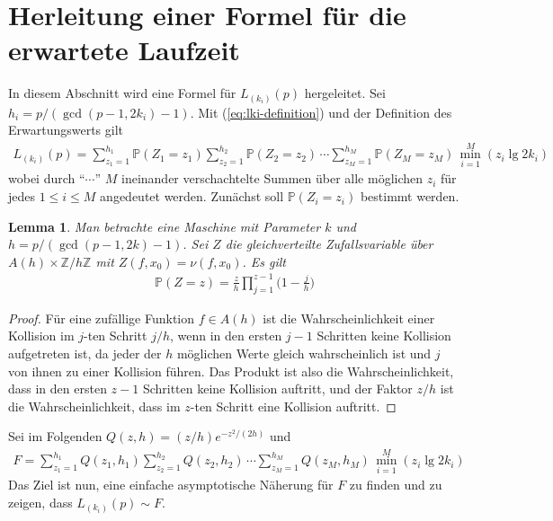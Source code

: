 \documentclass[a4paper, 11pt, ngerman]{article}
\newcommand{\Z}{\mathbb{Z}}
\renewcommand{\P}{\mathbb{P}}
\theoremstyle{definition}
\theoremstyle{plain}
\newtheorem{lemma}{Lemma}
\theoremstyle{remark}
\begin{document}
\section{Herleitung einer Formel für die erwartete Laufzeit}
\label{sec:formula-running-time}

In diesem Abschnitt wird eine Formel für $L_{(k_i)}(p)$ hergeleitet. Sei $h_i = p/(\gcd(p - 1, 2k_i) - 1)$. Mit (\ref{eq:lki-definition}) und der Definition des Erwartungswerts gilt
\begin{align}
    L_{(k_i)}(p) =
    \sum_{z_1 = 1}^{h_1} \P(Z_1 = z_1)
    \sum_{z_2 = 1}^{h_2} \P(Z_2 = z_2) \, \cdots
    \sum_{z_M = 1}^{h_M} \P(Z_M = z_M)
    \, \min_{i = 1}^M(z_i \lg 2k_i)
    \label{eq:lki-written-out}
\end{align}
wobei durch "`$\cdots$"' $M$ ineinander verschachtelte Summen über alle möglichen $z_i$ für jedes $1 \le i \le M$ angedeutet werden. Zunächst soll $\P(Z_i = z_i)$ bestimmt werden.

\begin{lemma}
    Man betrachte eine Maschine mit Parameter $k$ und $h = p/(\gcd(p - 1, 2k) - 1)$. Sei $Z$ die gleichverteilte Zufallsvariable über $A(h) \times \Z/h\Z$ mit $Z(f, x_0) = \nu(f, x_0)$. Es gilt
    \begin{align*}
        \P(Z = z) = \frac z h \prod_{j = 1}^{z - 1} \bigg (1 - \frac j h \bigg )
    \end{align*}

    \label{lemma:prob-s-z}
\end{lemma}

\begin{proof}
    Für eine zufällige Funktion $f \in A(h)$ ist die Wahrscheinlichkeit einer Kollision im $j$-ten Schritt $j/h$, wenn in den ersten $j - 1$ Schritten keine Kollision aufgetreten ist, da jeder der $h$ möglichen Werte gleich wahrscheinlich ist und $j$ von ihnen zu einer Kollision führen. Das Produkt ist also die Wahrscheinlichkeit, dass in den ersten $z - 1$ Schritten keine Kollision auftritt, und der Faktor $z/h$ ist die Wahrscheinlichkeit, dass im $z$-ten Schritt eine Kollision auftritt.
\end{proof}

Sei im Folgenden $Q(z, h) = (z/h) e^{-z^2/(2h)}$ und
\begin{align}
    F =
    \sum_{z_1 = 1}^{h_1} Q(z_1, h_1)
    \sum_{z_2 = 1}^{h_2} Q(z_2, h_2) \, \cdots
    \sum_{z_M = 1}^{h_M} Q(z_M, h_M)
    \, \min_{i = 1}^M(z_i \lg 2k_i)
    \label{eq:f-definition}
\end{align}
Das Ziel ist nun, eine einfache asymptotische Näherung für $F$ zu finden und zu zeigen, dass $L_{(k_i)}(p) \sim F$.
\end{document}
